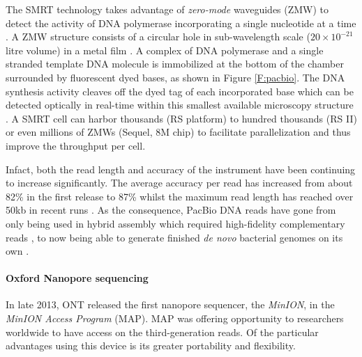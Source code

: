 The SMRT technology takes advantage of \emph{zero-mode} waveguides (ZMW) to detect the activity of DNA polymerase incorporating a single nucleotide at a time \cite{Rhoads2015}. 
A ZMW structure consists of a circular hole in sub-wavelength scale ($20\times10^{-21}$ litre volume) in a metal film \cite{Korlach2008selective}. A complex of DNA polymerase and a single stranded template DNA molecule is immobilized at the bottom of the chamber surrounded by fluorescent dyed bases, as shown in Figure \ref{F:pacbio}. The DNA synthesis activity cleaves off the dyed tag of each incorporated base which can be detected optically in real-time within this smallest available microscopy structure \cite{Levene2003zero}. A SMRT cell can harbor thousands (RS platform) to hundred thousands (RS II) or even millions of ZMWs (Sequel, 8M chip) to facilitate parallelization and thus improve the throughput per cell. 

Infact, both the read length and accuracy of the instrument have been continuing to increase significantly. The average accuracy per read has increased from about 82\% in the first release to 87\% \cite{Eid2009,Koren2013} whilst the maximum read length has reached over 50kb in recent runs \cite{Berlin2015}. 
As the consequence, PacBio DNA reads have gone from only being used in hybrid assembly which required high-fidelity complementary reads \cite{KorenSW2012, Ribeiro2012}, to now being able to generate finished \emph{de novo} bacterial genomes on its own \cite{Koren2013}.

\paragraph{Oxford Nanopore sequencing} 
In late 2013, ONT released the first nanopore sequencer, the \emph{MinION}, in the \emph{MinION Access Program} (MAP).
MAP was offering opportunity to researchers worldwide to have access on the third-generation reads. 
Of the particular advantages using this device is its greater portability and flexibility.

